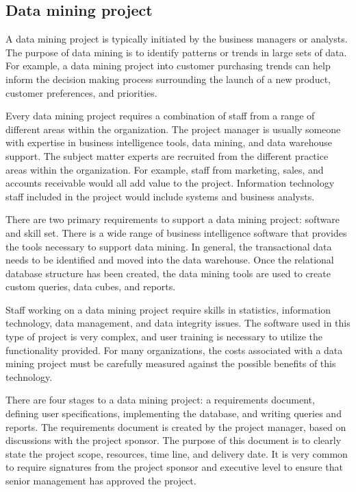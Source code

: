 \subsection{Data mining project}
A data mining project is typically initiated by the business managers or analysts. The purpose of data mining is to identify patterns or trends in large sets of data. For example, a data mining project into customer purchasing trends can help inform the decision making process surrounding the launch of a new product, customer preferences, and priorities.

Every data mining project requires a combination of staff from a range of different areas within the organization. The project manager is usually someone with expertise in business intelligence tools, data mining, and data warehouse support. The subject matter experts are recruited from the different practice areas within the organization. For example, staff from marketing, sales, and accounts receivable would all add value to the project. Information technology staff included in the project would include systems and business analysts.

There are two primary requirements to support a data mining project: software and skill set. There is a wide range of business intelligence software that provides the tools necessary to support data mining. In general, the transactional data needs to be identified and moved into the data warehouse. Once the relational database structure has been created, the data mining tools are used to create custom queries, data cubes, and reports.

Staff working on a data mining project require skills in statistics, information technology, data management, and data integrity issues. The software used in this type of project is very complex, and user training is necessary to utilize the functionality provided. For many organizations, the costs associated with a data mining project must be carefully measured against the possible benefits of this technology.

There are four stages to a data mining project: a requirements document, defining user specifications, implementing the database, and writing queries and reports. The requirements document is created by the project manager, based on discussions with the project sponsor. The purpose of this document is to clearly state the project scope, resources, time line, and delivery date. It is very common to require signatures from the project sponsor and executive level to ensure that senior management has approved the project.

